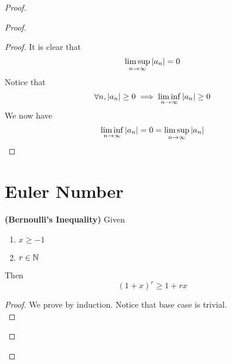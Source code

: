 \documentclass{report}
\begin{document}
\begin{proof}
\begin{proof}
\begin{proof}
It is clear that 
\begin{equation*}
\limsup_{n\to\infty} |a_n|=0
\end{equation*}
Notice that  
\begin{equation*}
\forall n,|a_n|\geq 0\implies \liminf_{n\to\infty} |a_n|\geq 0
\end{equation*}
We now have 
\begin{equation*}
\liminf_{n\to\infty} |a_n|=0=\limsup_{n\to\infty} |a_n|
\end{equation*}
\end{proof}





\section{Euler Number}
\begin{lemma}
\label{4.5.1}
\textbf{(Bernoulli's Inequality)} Given 
\begin{enumerate}[label=(\alph*)]
  \item $x\geq -1$
  \item $r\in\mathbb{N}$
\end{enumerate}
Then
\begin{equation}
  (1+x)^r\geq 1+rx
\end{equation}
\end{lemma}
\begin{proof}
We prove by induction. Notice that base case is trivial.\\


\end{proof}
\end{proof}
\end{proof}
\end{document}

